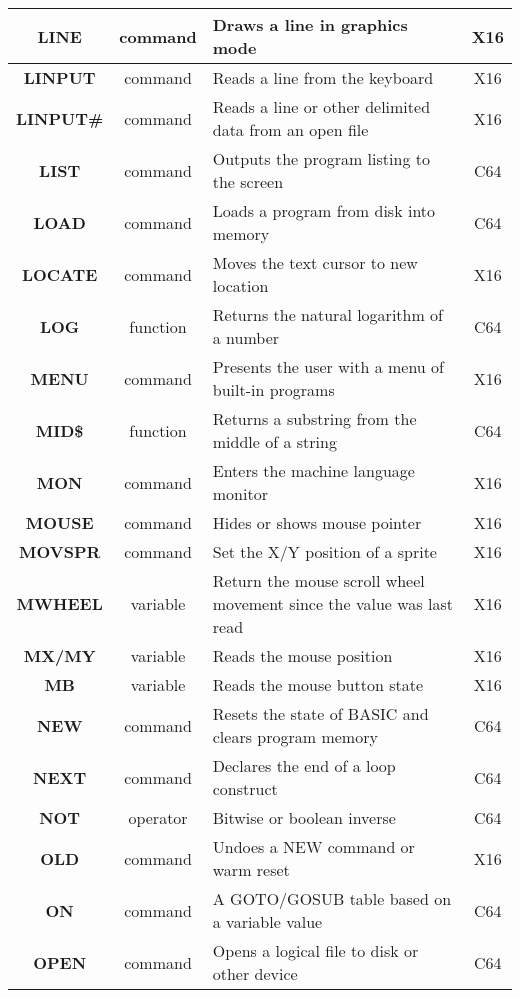 \begin{longtable}{|c|c|m{4cm}|c|}
	{\bfseries LINE} & command & Draws a line in graphics mode & X16 \\ \hline
	{\bfseries LINPUT} & command & Reads a line from the keyboard & X16 \\ \hline
	{\bfseries LINPUT\#} & command & Reads a line or other delimited data from an open file & X16 \\ \hline
	{\bfseries LIST} & command & Outputs the program listing to the screen & C64 \\ \hline
	{\bfseries LOAD} & command & Loads a program from disk into memory & C64 \\ \hline
	{\bfseries LOCATE} & command & Moves the text cursor to new location & X16 \\ \hline
	{\bfseries LOG} & function & Returns the natural logarithm of a number & C64 \\ \hline
	{\bfseries MENU} & command & Presents the user with a menu of built-in programs & X16 \\ \hline
	{\bfseries MID\$} & function & Returns a substring from the middle of a string & C64 \\ \hline
	{\bfseries MON} & command & Enters the machine language monitor & X16 \\ \hline
	{\bfseries MOUSE} & command & Hides or shows mouse pointer & X16 \\ \hline
	{\bfseries MOVSPR} & command & Set the X/Y position of a sprite & X16 \\ \hline
	{\bfseries MWHEEL} & variable & Return the mouse scroll wheel movement since the value was last read & X16 \\ \hline
	{\bfseries MX/MY} & variable & Reads the mouse position & X16 \\ \hline
	{\bfseries MB} & variable & Reads the mouse button state & X16 \\ \hline
	{\bfseries NEW} & command & Resets the state of BASIC and clears program memory & C64 \\ \hline
	{\bfseries NEXT} & command & Declares the end of a loop construct & C64 \\ \hline
	{\bfseries NOT} & operator & Bitwise or boolean inverse & C64 \\ \hline
	{\bfseries OLD} & command & Undoes a NEW command or warm reset & X16 \\ \hline
	{\bfseries ON} & command & A GOTO/GOSUB table based on a variable value & C64 \\ \hline
	{\bfseries OPEN} & command & Opens a logical file to disk or other device & C64 \\ \hline

\end{longtable}
